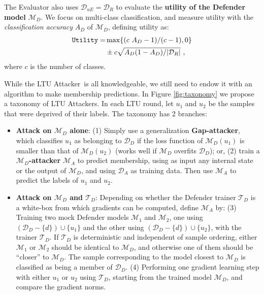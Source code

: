 \documentclass[letterpaper]{article}
\newcommand{\sminus}{-}
\newcommand{\oracle}{LTU Attacker~}
\begin{document}
The Evaluator also uses $\mathcal{D}_{uE} = \mathcal{D}_R$ to evaluate the {\bf utility of the Defender model} $\mathcal{M}_D$. We focus on multi-class classification, and measure utility with the {\em classification accuracy} $A_D$ of $\mathcal{M}_D$, defining utility as:
\begin{align}
    \texttt{Utility} = & \max\{(c~A_D - 1)/(c-1), 0\} \notag \\
    & \pm c \sqrt{A_D(1-A_D)/|\mathcal{D}_{R}|}~,
\label{equation:utility}
\end{align}
where $c$ is the number of classes.

While the \oracle is all knowledgeable, we still need to endow it with an algorithm to make membership predictions. In Figure \ref{fig:taxonomy} we propose a taxonomy of LTU Attackers.
In each LTU round, let $u_1$ and $u_2$ be the samples that were deprived of their labels. The taxonomy has 2 branches:
\begin{itemize}
    \item {\bf  Attack on $\mathcal{M}_D$ alone}: (1) Simply use a generalization {\bf Gap-attacker}, which classifies $u_1$ as belonging to $\mathcal{D}_D$ if the loss function of $\mathcal{M}_D(u_1)$ is smaller than that of  $\mathcal{M}_D(u_2)$ (works well if  $\mathcal{M}_D$ overfits $\mathcal{D}_D$); or,
    (2) train a {\bf $\mathcal{M}_D$-attacker} $\mathcal{M}_A$ to predict membership, using as input any internal state or the output of $\mathcal{M}_D$, and using $\mathcal{D}_A$ as training data. Then use $\mathcal{M}_A$ to predict the labels of $u_1$ and $u_2$.

    \item {\bf  Attack on $\mathcal{M}_D$ and $\mathcal{T}_D$}: Depending on whether the Defender trainer $\mathcal{T}_D$ is a white-box from which gradients can be computed, define  $\mathcal{M}_A$ by: (3) Training two mock Defender models $\mathcal{M}_1$ and $\mathcal{M}_2$, one using $(\mathcal{D}_D\sminus\{d\})\cup \{u_1\}$ and the other using $(\mathcal{D}_D\sminus\{d\})\cup \{u_2\}$, with the trainer $\mathcal{T}_D$. If $\mathcal{T}_D$ is deterministic and independent of sample ordering, either $\mathcal{M}_1$ or $\mathcal{M}_2$ should be identical to $\mathcal{M}_D$, and otherwise one of them should be ``closer'' to $\mathcal{M}_D$. The sample corresponding to the model closest to $\mathcal{M}_D$ is classified as being a member of $\mathcal{D}_D$. (4) Performing one gradient learning step with either $u_1$ or $u_2$ using $\mathcal{T}_D$, starting from the trained model $\mathcal{M}_D$, and compare the gradient norms.
\end{itemize}
\end{document}
